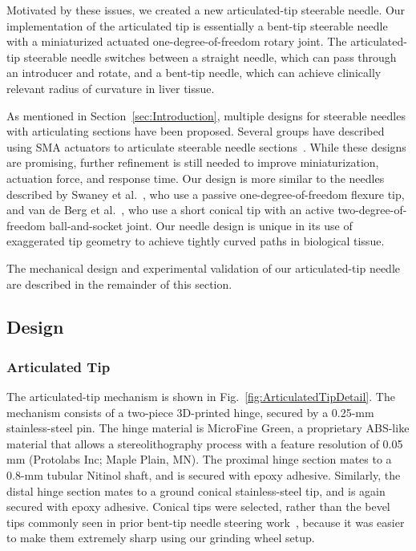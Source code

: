 Motivated by these issues, we created a new articulated-tip steerable needle. Our implementation of the articulated tip is essentially a bent-tip steerable needle with a miniaturized actuated one-degree-of-freedom rotary joint. The articulated-tip steerable needle switches between a straight needle, which can pass through an introducer and rotate, and a bent-tip needle, which can achieve clinically relevant radius of curvature in liver tissue.

As mentioned in Section~\ref{sec:Introduction}, multiple designs for steerable needles with articulating sections have been proposed. Several groups have described using SMA actuators to articulate steerable needle sections~\cite{Ayvali2012,Datla2014,Ryu2014}. While these designs are promising, further refinement is still needed to improve miniaturization, actuation force, and response time. Our design is more similar to the needles described by Swaney et al.~\cite{Swaney2013}, who use a passive one-degree-of-freedom flexure tip, and van de Berg et al.~\cite{vandeBerg2015}, who use a short conical tip with an active two-degree-of-freedom ball-and-socket joint. Our needle design is unique in its use of exaggerated tip geometry to achieve tightly curved paths in biological tissue.

The mechanical design and experimental validation of our articulated-tip needle are described in the remainder of this section.

\subsection{Design}
\subsubsection{Articulated Tip}
The articulated-tip mechanism is shown in Fig.~\ref{fig:ArticulatedTipDetail}. The mechanism consists of a two-piece 3D-printed hinge, secured by a 0.25-mm stainless-steel pin. The hinge material is MicroFine Green, a proprietary ABS-like material that allows a stereolithography process with a feature resolution of 0.05 mm (Protolabs Inc; Maple Plain, MN). The proximal hinge section mates to a 0.8-mm tubular Nitinol shaft, and is secured with epoxy adhesive. Similarly, the distal hinge section mates to a ground conical stainless-steel tip, and is again secured with epoxy adhesive. Conical tips were selected, rather than the bevel tips commonly seen in prior bent-tip needle steering work~\cite{Majewicz2010,Majewicz2012}, because it was easier to make them extremely sharp using our grinding wheel setup. 

